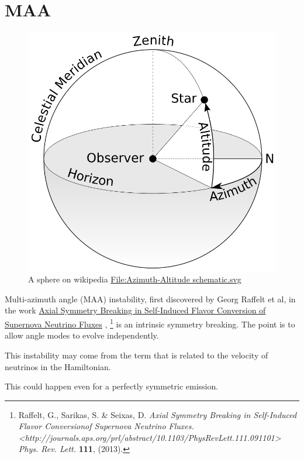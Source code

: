 \documentclass[letterpaper,12pt,english]{sphinxmanual}
\begin{document}
\section{MAA}
\label{instability:maa}\begin{figure}[htbp]
\centering
\capstart

\includegraphics{sphericalAngles.png}
\caption{A sphere on wikipedia \href{https://commons.wikimedia.org/wiki/File:Azimuth-Altitude\_schematic.svg}{File:Azimuth-Altitude schematic.svg}}\end{figure}

Multi-azimuth angle (MAA) instability, first discovered by Georg Raffelt et al, in the work \href{http://journals.aps.org/prl/abstract/10.1103/PhysRevLett.111.091101}{Axial Symmetry Breaking in Self-Induced Flavor Conversion of Supernova Neutrino Fluxes} , \footnote{
Raffelt, G., Sarikas, S. \& Seixas, D. \emph{Axial Symmetry Breaking in Self-Induced Flavor Conversionof Supernova Neutrino Fluxes. \textless{}http://journals.aps.org/prl/abstract/10.1103/PhysRevLett.111.091101\textgreater{}} \emph{Phys. Rev. Lett.} \textbf{111}, (2013).
} is an intrinsic symmetry breaking. The point is to allow angle modes to evolve independently.

This instability may come from the term that is related to the velocity of neutrinos in the Hamiltonian.

This could happen even for a perfectly symmetric emission.
\end{document}
